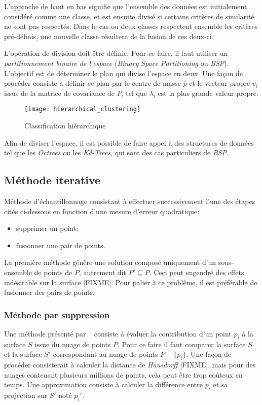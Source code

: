 L'approche de haut en bas signifie que l'ensemble des données est initialement considéré comme une classe, et est ensuite divisé si certains critères de similarité ne sont pas respectés. Dans le cas ou deux classes respectent ensemble les critères pré-définis, une nouvelle classe résultera de la fusion de ces deux-ci.

L'opération de division doit être définie. Pour ce faire, il faut utiliser un \emph{partitionnement binaire de l'espace} (\emph{Binary Space Partitioning} ou \emph{BSP}). L'objectif est de déterminer le plan qui divise l'espace en deux. Une façon de procéder consiste à définir ce plan par le centre de masse $\overline{p}$ et le vecteur propre $v_i$ issus de la matrice de covariance de $P$, tel que $\lambda_i$ est la plus grande valeur propre.

\begin{figure}
  \centering
  \texttt{[image: hierarchical\_clustering]}
  \caption{Classification hiérarchique~\cite{Pauly2002}}
  \label{fig:sampling_hierarchical}
\end{figure}

Afin de diviser l'espace, il est possible de faire appel à des structures de données tel que les \emph{Octrees} ou les \emph{Kd-Trees}, qui sont des cas particuliers de \emph{BSP}.

\subsection{Méthode iterative}
\begin{definition}
  Méthode d'échantillonnage consistant à effectuer successivement l'une des étapes cités ci-dessous en fonction d'une mesure d'erreur quadratique:
  \begin{itemize}
    \item supprimer un point;
    \item fusionner une pair de points.
  \end{itemize}
\end{definition}

La première méthode génère une solution composé uniquement d'un sous-ensemble de points de $P$, autrement dit $P' \subseteq P$. Ceci peut engendré des effets indésirable sur la surface [FIXME]. Pour palier à ce problème, il est préférable de fusionner des pairs de points.

\subsubsection{Méthode par suppression}
Une méthode présenté par \citeauthor{Alexa2001}~\cite{Alexa2001} consiste à évaluer la contribution d'un point $p_i$ à la surface $S$ issue du nuage de points $P$. Pour ce faire il faut comparer la surface $S$ et la surface $S'$ correspondant au nuage de points $P-\{p_i\}$. Une façon de procéder consisterait à calculer la distance de \emph{Hausdorff} [FIXME], mais pour des nuages contenant plusieurs millions de points, cela peut être trop coûteux en temps. Une approximation consiste à calculer la différence entre $p_i$ et sa projection sur $S'$ noté $p_i'$.\\

